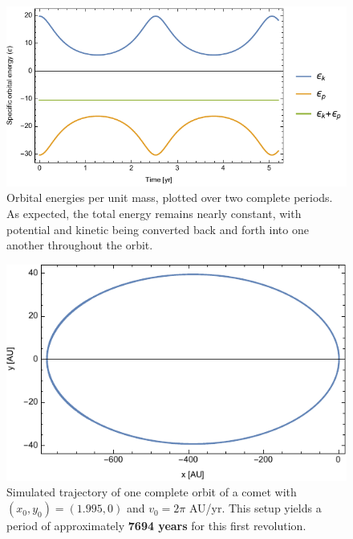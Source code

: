 \documentclass{article}
\begin{document}
\begin{figure}[h!]
    \centering
    \includegraphics[width=5in]{homework3/q3energy.pdf}
    \caption{Orbital energies per unit mass, plotted over two complete periods. As expected, the total energy remains nearly constant, with potential and kinetic being converted back and forth into one another throughout the orbit.}
    \label{fig:q3energy}
\end{figure}

\bigskip
{}
\medskip

\begin{figure}[h!]
    \centering
    \includegraphics[width=5in]{homework3/q4orbit.pdf}
    \caption{Simulated trajectory of one complete orbit of a comet with $(x_0,y_0)=(1.995,0)$ and $v_0=2\pi$ AU/yr. This setup yields a period of approximately \textbf{7694 years} for this first revolution.}
    \label{fig:q4orbit}
\end{figure}
\end{document}
